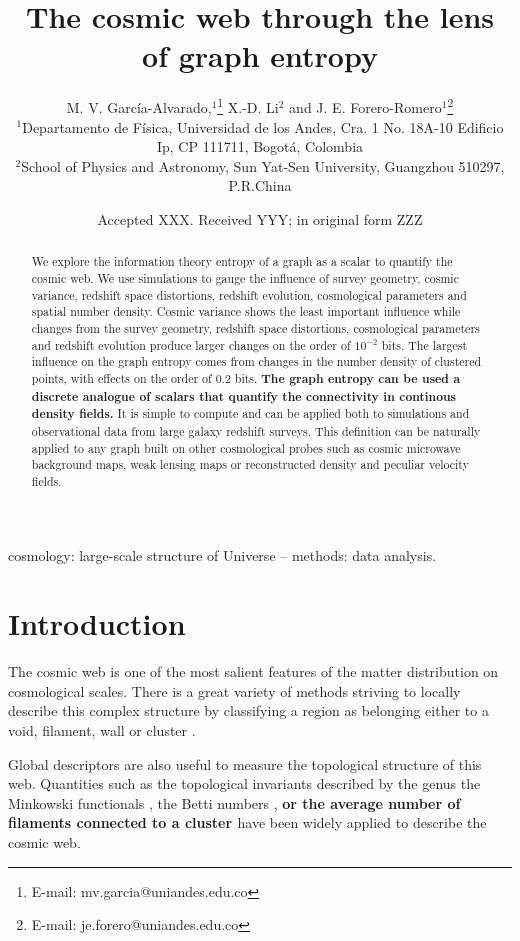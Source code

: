 \documentclass[fleqn,usenatbib]{mnras}
\title[Cosmic Web Graph Entropy]{The cosmic web through the lens of graph entropy}
\author[Garc\'ia-Alvarado et al.]{
M. V. Garc\'ia-Alvarado,$^{1}$\thanks{E-mail: mv.garcia@uniandes.edu.co}
X.-D. Li$^{2}$
and J. E. Forero-Romero$^{1}$\thanks{E-mail: je.forero@uniandes.edu.co}
\\
$^{1}$Departamento de F\'isica, Universidad de los Andes, Cra. 1 No. 18A-10 Edificio Ip, CP 111711, Bogot\'a, Colombia\\
$^{2}$School of Physics and Astronomy, Sun Yat-Sen University, Guangzhou 510297, P.R.China\\
}
\date{Accepted XXX. Received YYY; in original form ZZZ}
\begin{document}
\label{firstpage}
\pagerange{\pageref{firstpage}--\pageref{lastpage}}
\maketitle

\begin{abstract}
  We explore the information theory entropy of a graph as a scalar to
  quantify the cosmic web. 
  We use simulations to gauge the influence of survey geometry, cosmic variance, 
  redshift space distortions, redshift evolution, cosmological parameters and 
  spatial number density.  
  Cosmic variance shows the least important influence while
  changes from the survey geometry, redshift space distortions, cosmological 
  parameters and redshift evolution produce larger changes on the
  order of $10^{-2}$ bits.
  The largest influence on the graph entropy comes from changes in the 
  number density of clustered points, with effects on the order of $0.2$ bits.
\textbf{The graph entropy can be
  used a discrete analogue of scalars that quantify the connectivity in
  continous density fields.}
  It is simple to compute and can be applied both to simulations and observational data 
  from large galaxy redshift surveys.
  This definition can be naturally applied to any graph built on other cosmological 
  probes such as cosmic microwave background maps, weak lensing maps or reconstructed
  density and peculiar velocity fields.
\end{abstract}
\begin{keywords}
cosmology: large-scale structure of Universe -- methods: data analysis.
\end{keywords}


\section{Introduction}

The cosmic web is one of the most salient features of the matter distribution
on cosmological scales. 
There is a great variety of methods striving to locally describe this complex 
structure by classifying a region as belonging either
to a void, filament, wall or cluster \citep{2018MNRAS.473.1195L}. 

Global descriptors are also useful to measure the topological structure of this web.
Quantities such as the topological invariants described by  the genus
\citep{1986ApJ...309....1H, 1986ApJ...306..341G} the Minkowski functionals 
\citep{1997ApJ...482L...1S}, the Betti numbers
\citep{2013JKAS...46..125P,2017MNRAS.465.4281P}, \textbf{or the average
number of filaments connected to a cluster \citep{2018MNRAS.479..973C}
} have been widely applied to describe the cosmic web. 
\end{document}
